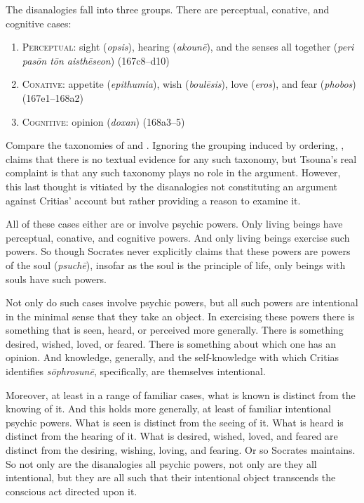 The disanalogies fall into three groups. There are perceptual, conative, and cognitive cases:
\begin{enumerate}[(1)]
	\item \textsc{Perceptual}: sight (\emph{opsis}), hearing (\emph{akounē}), and the senses all together (\emph{peri pasōn tōn aisthēseon}) (167c8–d10)
	\item \textsc{Conative}: appetite (\emph{epithumia}), wish (\emph{boulēsis}), love (\emph{eros}), and fear (\emph{phobos}) (167e1–168a2)
	\item \textsc{Cognitive}: opinion (\emph{doxan}) (168a3–5)
\end{enumerate}
Compare the taxonomies of \citealt[114–8]{Hyland:1981aa} and \citealt[90]{Schmid:1998aa}. Ignoring the grouping induced by ordering, \citealt[207 n37]{Tsouna:2022aa}, claims that there is no textual evidence for any such taxonomy, but Tsouna's real complaint is that any such taxonomy plays no role in the argument. However, this last thought is vitiated by the disanalogies not constituting an argument against Critias' account but rather providing a reason to examine it.

All of these cases either are or involve psychic powers. Only living beings have perceptual, conative, and cognitive powers. And only living beings exercise such powers. So though Socrates never explicitly claims that these powers are powers of the soul (\emph{psuchē}), insofar as the soul is the principle of life, only beings with souls have such powers. 

Not only do such cases involve psychic powers, but all such powers are intentional in the minimal sense that they take an object. In exercising these powers there is something that is seen, heard, or perceived more generally. There is something desired, wished, loved, or feared. There is something about which one has an opinion. And knowledge, generally, and the self-knowledge with which Critias identifies \emph{sōphrosunē}, specifically, are themselves intentional. 

Moreover, at least in a range of familiar cases, what is known is distinct from the knowing of it. And this holds more generally, at least of familiar intentional psychic powers. What is seen is distinct from the seeing of it. What is heard is distinct from the hearing of it. What is desired, wished, loved, and feared are distinct from the desiring, wishing, loving, and fearing. Or so Socrates maintains. So not only are the disanalogies all psychic powers, not only are they all intentional, but they are all such that their intentional object transcends the conscious act directed upon it.

